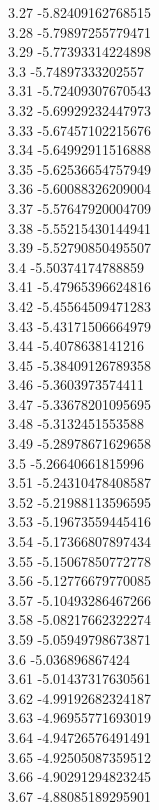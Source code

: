 {3.27	-5.82409162768515\\
3.28	-5.79897255779471\\
3.29	-5.77393314224898\\
3.3	-5.74897333202557\\
3.31	-5.72409307670543\\
3.32	-5.69929232447973\\
3.33	-5.67457102215676\\
3.34	-5.64992911516888\\
3.35	-5.62536654757949\\
3.36	-5.60088326209004\\
3.37	-5.57647920004709\\
3.38	-5.55215430144941\\
3.39	-5.52790850495507\\
3.4	-5.50374174788859\\
3.41	-5.47965396624816\\
3.42	-5.45564509471283\\
3.43	-5.43171506664979\\
3.44	-5.4078638141216\\
3.45	-5.38409126789358\\
3.46	-5.3603973574411\\
3.47	-5.33678201095695\\
3.48	-5.3132451553588\\
3.49	-5.28978671629658\\
3.5	-5.26640661815996\\
3.51	-5.24310478408587\\
3.52	-5.21988113596595\\
3.53	-5.19673559445416\\
3.54	-5.17366807897434\\
3.55	-5.15067850772778\\
3.56	-5.12776679770085\\
3.57	-5.10493286467266\\
3.58	-5.08217662322274\\
3.59	-5.05949798673871\\
3.6	-5.036896867424\\
3.61	-5.01437317630561\\
3.62	-4.99192682324187\\
3.63	-4.96955771693019\\
3.64	-4.94726576491491\\
3.65	-4.92505087359512\\
3.66	-4.90291294823245\\
3.67	-4.88085189295901\\
}
